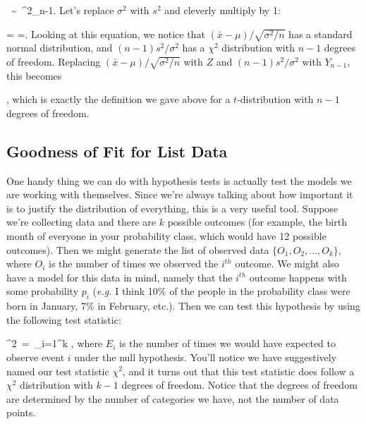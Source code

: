 \bel
{}\ \sim \ \chi^2_{n-1}.
\eel
Let's replace $\sigma^2$ with $s^2$ and cleverly multiply by 1:

\bel
{} = =\cdot {}.
\eel
Looking at this equation, we notice that $(\bar{x}-\mu)/\sqrt{\sigma^2/n}$ has a standard normal distribution, and $(n-1)s^2/\sigma^2$ has a $\chi^2$ distribution with $n-1$ degrees of freedom.  Replacing $(\bar{x}-\mu)/\sqrt{\sigma^2/n}$ with $Z$ and $(n-1)s^2/\sigma^2$ with $Y_{n-1}$, this becomes

\bel
{},
\eel
which is exactly the definition we gave above for a $t$-distribution with $n-1$ degrees of freedom.


\subsection{Goodness of Fit for List Data}

One handy thing we can do with hypothesis tests is actually test the models we are working with themselves.  Since we're always talking about how important it is to justify the distribution of everything, this is a very useful tool.  Suppose we're collecting data and there are $k$ possible outcomes (for example, the birth month of everyone in your probability class, which would have 12 possible outcomes).  Then we might generate the list of observed data $\{O_1, O_2,..., O_k\}$, where $O_i$ is the number of times we observed the $i^{th}$ outcome.  We might also have a model for this data in mind, namely that the $i^{th}$ outcome happens with some probability $p_i$ (\emph{e.g.} I think 10\% of the people in the probability class were born in January, 7\% in February, etc.).  Then we can test this hypothesis by using the following test statistic:

\bel
\chi^2\ =\ \sum_{i=1}^k ,
\eel
where $E_i$ is the number of times we would have expected to observe event $i$ under the null hypothesis.  You'll notice we have suggestively named our test statistic $\chi^2$, and it turns out that this test statistic does follow a $\chi^2$ distribution with $k-1$ degrees of freedom.  Notice that the degrees of freedom are determined by the number of categories we have, not the number of data points.

